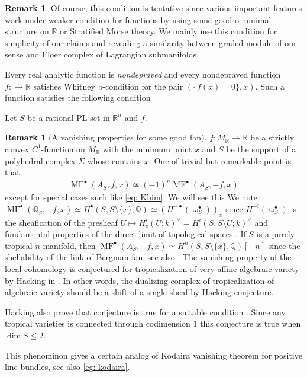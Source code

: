 \documentclass[a4paper,dvipdfmx,reqno,12pt]{amsart}
\theoremstyle{definition}
\newtheorem{Rmk}[Thm]{Remark}
\newcommand{\R}{\mathbb{R}}%
\newcommand{\Q}{\mathbb{Q}}%
\newcommand{\opn}[1]{\operatorname{#1}}
\numberwithin{equation}{section}
\begin{document}
\begin{Rmk}
Of course, this condition is tentative since various important
features work under weaker condition for functions by using 
some good o-minimal structure on $\R$ or Stratified Morse theory. We mainly use this condition for
simplicity of our claims and revealing a similarity between
graded module of our sense and Floer complex of Lagrangian 
submanifolds.
\end{Rmk}

Every real analytic function is \emph{nondepraved} 
\cite[Part I, Definition. 2.3,]{MR932724} and
every nondepraved function $f\colon \to \R$ satisfies Whitney b-condition
for the pair $(\{f(x)=0\},x)$. Such a function satisfies the 
following condition

Let $S$ be a rational PL set in $\R^{n}$ and
$f$.

\begin{Rmk}[{A vanishing properties
for some good fan}]
$f\colon M_{\R}\to \R$ be a strictly convex
$C^{1}$-function on $M_{\R}$ with the minimum point $x$
 and $S$ be the support of 
a polyhedral complex $\Sigma$ whose contains $x$.
One of trivial but remarkable point is that
\begin{align}
\opn{MF}^{\bullet}(A_S,f,x)\not\simeq (-1)^{n}
\opn{MF}^{\bullet}(A_S,-f,x)
\end{align}
except for special cases such like \cref{eq: Khim}.
We will see this
We note $\opn{MF}^{\bullet}(\Q_S,-f,x) \simeq 
H^{\bullet}(S,S\setminus \{x\};\Q)\simeq 
(H^{-\bullet}(\upomega_S^{\bullet}))_x$ since
$H^{-i}(\upomega_S^{\bullet})$ is the sheafication of
the presheaf $U\mapsto H_{c}^{i}(U;k)^{\vee}=H^{i}(S,S\setminus U;k)^{\vee}$
 \cite[]{iversenCohomologySheaves1986a} and fundamental properties of the direct limit of topological spaces \cite[Proposition 3.33]{hatcherAlgebraicTopology2002a}. 
If $S$ is a purely tropical $n$-manifold, then 
$\opn{MF}^{\bullet}(A_S,-f,x)\simeq H^{n}(S,S\setminus\{x\},\Q)[-n]$
since the shellability of the link of Bergman fan, see also
\cite[Theorem 6.2]{gross2019sheaftheoretic}.
The vanishing property of the local cohomology is conjectured for
tropicalization of very affine algebraic variety by Hacking in
\cite{MR2452307}.
In other words, the dualizing complex of tropicalization of 
algebraic variety should be a shift of a single sheaf 
by Hacking conjecture. 

Hacking also prove that conjecture is true for a suitable condition
\cite[Theorem 2.5]{MR2452307}.
Since any tropical varieties is connected
  through codimension $1$ \cite[Theorem 3.3.5]{maclaganIntroductionTropicalGeometry2015a}
  this conjecture is true when $\dim S \leq 2$.

This phenominon gives a certain analog of Kodaira vanishing theorem for 
positive line bundles, see 
also \cref{eg: kodaira}.
\end{Rmk}
\end{document}
